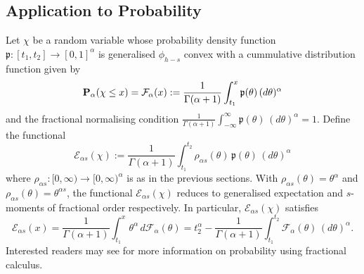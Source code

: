 \documentclass[10pt]{article}
\begin{document}
\subsection{Application to Probability}
Let $\chi$ be a random variable whose  probability density function $\mathfrak{p}:[t_1, t_2] \rightarrow [0,1]^\alpha$ is generalised $\phi_{h-s}$ convex with a cummulative distribution function given by
$${\bf P}_\alpha(\chi \leq x)=\mathcal{F}_\alpha(x) :=\frac{1}{\Gamma(\alpha +1)} \int_{t_1}^x \mathfrak{p}(\theta)\, (d\theta)^\alpha$$
and the fractional normalising condition $\frac{1}{\Gamma(\alpha+1)}\int_{-\infty}^{\infty} \mathfrak{p}(\theta)\, (d\theta)^\alpha =1$. Define the  functional 
$$\mathcal{E}_{\alpha s}(\chi):= \frac{1}{\Gamma(\alpha+1)}\int_{t_1}^{t_2} \rho_{\alpha s}(\theta)\, \mathfrak{p}(\theta)\, (d\theta)^\alpha$$
where $\rho_{\alpha s}:[0,\infty)\rightarrow [0,\infty)^\alpha$ is as  in the previous sections. With $\rho_{\alpha s}(\theta)=\theta^\alpha$ and $\rho_{\alpha s}(\theta)=\theta^{\alpha s} $, the functional $\mathcal{E}_{\alpha s}({\chi})$ reduces to  generalised expectation and $s$-moments of fractional order respectively. In particular, $\mathcal{E}_{\alpha s}(\chi)$ satisfies
$$\mathcal{E}_{\alpha s}(x) =\frac{1}{\Gamma(\alpha+1)}\int_{t_1}^x \theta^\alpha\, d\mathcal{F}_\alpha (\theta)= t_2^\alpha -\frac{1}{\Gamma(\alpha+1)} \int_{t_1}^{t_2} \mathcal{F}_\alpha (\theta) \, (d\theta)^\alpha.$$
 Interested readers may see \cite{ju, abd} for more information on probability using fractional calculus.
\end{document}

